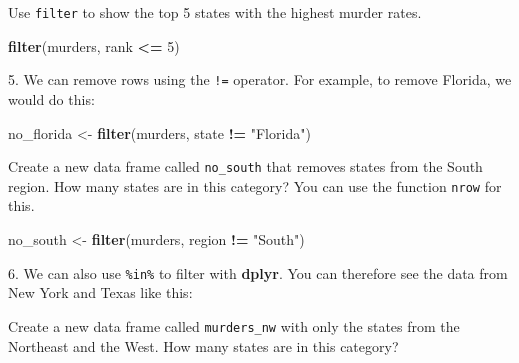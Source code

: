 \documentclass[
]{krantz}
\newenvironment{Shaded}{\begin{snugshade}}{\end{snugshade}}
\newcommand{\CommentTok}[1]{\textcolor[rgb]{0.37,0.37,0.37}{\textit{#1}}}
\newcommand{\DecValTok}[1]{\textcolor[rgb]{0.06,0.06,0.06}{#1}}
\newcommand{\KeywordTok}[1]{\textcolor[rgb]{0.27,0.27,0.27}{\textbf{#1}}}
\newcommand{\NormalTok}[1]{#1}
\newcommand{\OperatorTok}[1]{\textcolor[rgb]{0.43,0.43,0.43}{\textbf{#1}}}
\newcommand{\StringTok}[1]{\textcolor[rgb]{0.5,0.5,0.5}{#1}}
\begin{document}
Use \texttt{filter} to show the top 5 states with the highest murder rates.

\begin{Shaded}
\begin{Highlighting}[]
\KeywordTok{filter}\NormalTok{(murders, rank }\OperatorTok{<=}\StringTok{ }\DecValTok{5}\NormalTok{)}
\end{Highlighting}
\end{Shaded}

5. We can remove rows using the \texttt{!=} operator. For example, to remove Florida, we would do this:

\begin{Shaded}
\begin{Highlighting}[]
\NormalTok{no_florida <-}\StringTok{ }\KeywordTok{filter}\NormalTok{(murders, state }\OperatorTok{!=}\StringTok{ "Florida"}\NormalTok{)}
\end{Highlighting}
\end{Shaded}

Create a new data frame called \texttt{no\_south} that removes states from the South region. How many states are in this category? You can use the function \texttt{nrow} for this.

\begin{Shaded}
\begin{Highlighting}[]
\NormalTok{no_south <-}\StringTok{ }\KeywordTok{filter}\NormalTok{(murders, region }\OperatorTok{!=}\StringTok{ "South"}\NormalTok{)}
\end{Highlighting}
\end{Shaded}

6. We can also use \texttt{\%in\%} to filter with \textbf{dplyr}. You can therefore see the data from New York and Texas like this:

\begin{Shaded}
\end{Shaded}

Create a new data frame called \texttt{murders\_nw} with only the states from the Northeast and the West. How many states are in this category?

\begin{Shaded}
\end{Shaded}
\end{document}

